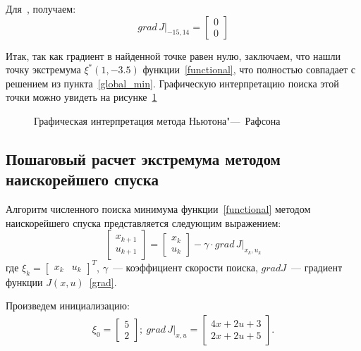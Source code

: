 Для \,, получаем:
\begin{equation}
	grad\,J \Big|_{-15, 14}	
	= 
	\begin{bmatrix}
		0 \\ 0
	\end{bmatrix}
\end{equation}

Итак, так как градиент в найденной точке равен нулю, заключаем, что нашли точку экстремума $\xi^*(1, -3.5)$ функции~\eqref{functional}, что полностью совпадает с решением из пункта~\ref{global_min}. Графическую интерпретацию поиска этой точки можно увидеть на рисунке~\ref{NR}

\begin{figure}[h!]
	\begin{minipage}[h]{0.5\linewidth}
	\end{minipage}
	\hfill
	\begin{minipage}[h]{0.5\linewidth}
	\end{minipage}
	\caption{Графическая интерпретация метода Ньютона"---~Рафсона}
	\label{NR}
\end{figure}


\subsection{Пошаговый расчет экстремума методом наискорейшего спуска}
Алгоритм численного поиска минимума функции~\eqref{functional} методом наискорейшего спуска представляется следующим выражением:
\begin{equation}\label{fd}
	\begin{bmatrix}
	x_{k+1} \\ u_{k+1}
	\end{bmatrix}
	= 
	\begin{bmatrix}
	x_k \\ u_k
	\end{bmatrix}
	-
	\gamma \cdot grad\,J \Big|_{x_k, u_k}
\end{equation}
где $\xi_k = \begin{bmatrix}x_k & u_k\end{bmatrix}^T\!$, $\gamma$~--- коэффициент скорости поиска, $grad J$~--- градиент функции $J(x,u)$~\eqref{grad}.

Произведем инициализацию:
\begin{align*}
	\xi_0 =
	\begin{bmatrix}
	5 \\ 2
	\end{bmatrix}\!\!;~
	grad\,J \Big|_{x,u}= 
	\begin{bmatrix}
	4 x + 2 u + 3 \\
	2 x + 2 u + 5
	\end{bmatrix}\!\!.
\end{align*}

